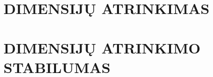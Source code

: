 \documentclass[12pt, a4paper]{article}
\begin{document}


\let \savenumberline \numberline
\def \numberline#1{\savenumberline{#1.}}
\tableofcontents 
\newpage


\newpage


\newpage

\section{DIMENSIJŲ ATRINKIMAS}
%


\section{DIMENSIJŲ ATRINKIMO STABILUMAS}
%



\end{document}
